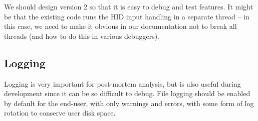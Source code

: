 We should design version 2 so that it is easy to debug and test features. It
might be that the existing code runs the HID input handling in a separate 
thread -- in this case, we need to make it obvious in our documentation not to 
break all threads (and how to do this in various debuggers).

\subsection{Logging}

Logging is very important for post-mortem analysis, but is also useful during
development since it can be so difficult to debug. File logging should be 
enabled by default for the end-user, with only warnings and errors, with some
form of log  rotation to conserve user disk space.
